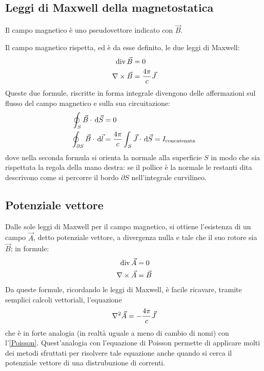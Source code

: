 \documentclass[../main.tex]{subfiles}
\begin{document}
\subsection{Leggi di Maxwell della magnetostatica}
Il campo magnetico è uno pseudovettore indicato con $\vec B$.

Il campo magnetico rispetta, ed è da esse definito, le due leggi di Maxwell:
\begin{align}
	\operatorname{div} \vec B &=0 \label{DivergenzaMagnetostatica} \\
	\nabla\times \vec B &=\frac{4\pi}c\vec J \label{LeggeAmpere}
\end{align}
Queste due formule, riscritte in forma integrale divengono delle affermazioni sul flusso del campo magnetico e sulla sua circuitazione:
\begin{align}
	\oint_S \vec B\cdot \,\mathrm d \vec S&=0 \label{NoMonopoliMagnetici} \\
	\oint_{\partial S} \vec B \cdot \,\mathrm d \vec l &= \frac{4\pi}c \int_S \vec J\cdot \,\mathrm d \vec S = I_{\text{concatenata}}\label{CircuitazioneMagnetico}
\end{align}
dove nella seconda formula si orienta la normale alla superficie $S$ in modo che sia rispettata la regola della mano destra: se il pollice è la normale le restanti dita descrivono come si percorre il bordo $\partial S$ nell'integrale curvilineo.

\subsection{Potenziale vettore}
Dalle sole leggi di Maxwell per il campo magnetico, si ottiene l'esistenza di un campo $\vec A$, detto potenziale vettore, a divergenza nulla e tale che il suo rotore sia $\vec B$; in formule:
\begin{align}
	\operatorname{div} \vec A &=0 \label{DivPotVettore} \\
	\nabla\times \vec A &=\vec B \label{RotPotVettore}
\end{align}
Da queste formule, ricordando le leggi di Maxwell, è facile ricavare, tramite semplici calcoli vettoriali, l'equazione
\begin{equation*}  \label{PoissonMagnetico}
	\nabla^2 \vec A=-\frac{4\pi}c\vec J
\end{equation*}
che è in forte analogia (in realtà uguale a meno di cambio di nomi) con l'\cref{Poisson}.
Quest'analogia con l'equazione di Poisson permette di applicare molti dei metodi sfruttati per risolvere tale equazione anche quando si cerca il potenziale vettore di una distrubuzione di correnti.
\end{document}
